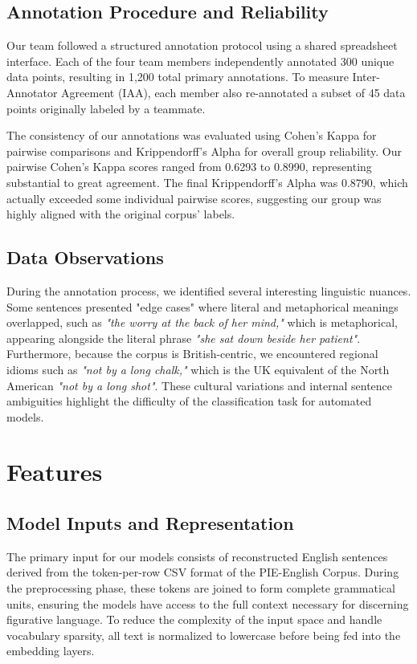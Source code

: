 \documentclass[11pt]{article}
\begin{document}
\subsection{Annotation Procedure and Reliability}
Our team followed a structured annotation protocol using a shared spreadsheet interface. Each of the four team members independently annotated 300 unique data points, resulting in 1,200 total primary annotations. To measure Inter-Annotator Agreement (IAA), each member also re-annotated a subset of 45 data points originally labeled by a teammate.

The consistency of our annotations was evaluated using Cohen's Kappa for pairwise comparisons and Krippendorff's Alpha for overall group reliability. Our pairwise Cohen's Kappa scores ranged from 0.6293 to 0.8990, representing substantial to great agreement. The final Krippendorff's Alpha was 0.8790, which actually exceeded some individual pairwise scores, suggesting our group was highly aligned with the original corpus' labels.

\subsection{Data Observations}
During the annotation process, we identified several interesting linguistic nuances. Some sentences presented "edge cases" where literal and metaphorical meanings overlapped, such as \textit{"the worry at the back of her mind,"} which is metaphorical, appearing alongside the literal phrase \textit{"she sat down beside her patient"}. Furthermore, because the corpus is British-centric, we encountered regional idioms such as \textit{"not by a long chalk,"} which is the UK equivalent of the North American \textit{"not by a long shot"}. These cultural variations and internal sentence ambiguities highlight the difficulty of the classification task for automated models.


\section{Features}

\subsection{Model Inputs and Representation}
The primary input for our models consists of reconstructed English sentences derived from the token-per-row CSV format of the PIE-English Corpus. During the preprocessing phase, these tokens are joined to form complete grammatical units, ensuring the models have access to the full context necessary for discerning figurative language. To reduce the complexity of the input space and handle vocabulary sparsity, all text is normalized to lowercase before being fed into the embedding layers.
\end{document}
